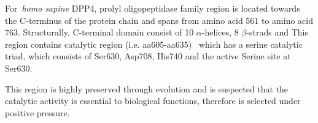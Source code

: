 For~\textit{homo sapine} DPP4, prolyl oligopeptidase family region is located towards the C-terminus of the protein chain and spans from amino acid 561 to amino acid 763. Structurally, C-terminal domain consist of 10 $\alpha$-helices, 8 $\beta$-strads and  This region contains catalytic region (i.e. aa605-aa635)~\cite{Rawlings1991,Barrett1992,Polgár1992,Rawlings1994} which has a serine catalytic triad, which consists of Ser630, Asp708, His740 and the active Serine site at Ser630. \par
This region is highly preserved through evolution and is suspected that the catalytic activity is essential to biological functions, therefore is selected under positive pressure. 